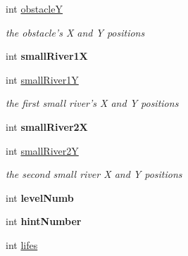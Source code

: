 \begin{DoxyCompactItemize}
\item 
\hypertarget{classlevels_ab81764075f081e95c05c12311556ff6b}{int \hyperlink{classlevels_ab81764075f081e95c05c12311556ff6b}{obstacle\-Y}}\label{classlevels_ab81764075f081e95c05c12311556ff6b}

\begin{DoxyCompactList}\small\item\em the obstacle's X and Y positions \end{DoxyCompactList}\item 
\hypertarget{classlevels_a91ffcd54642a5b8295120b633f2ea1ba}{int {\bfseries small\-River1\-X}}\label{classlevels_a91ffcd54642a5b8295120b633f2ea1ba}

\item 
\hypertarget{classlevels_a1804cb396c3fb68de1c9a7eae02d072b}{int \hyperlink{classlevels_a1804cb396c3fb68de1c9a7eae02d072b}{small\-River1\-Y}}\label{classlevels_a1804cb396c3fb68de1c9a7eae02d072b}

\begin{DoxyCompactList}\small\item\em the first small river's X and Y positions \end{DoxyCompactList}\item 
\hypertarget{classlevels_a6791f3ac3bd0ce71abebc9d97fdf5b99}{int {\bfseries small\-River2\-X}}\label{classlevels_a6791f3ac3bd0ce71abebc9d97fdf5b99}

\item 
\hypertarget{classlevels_accb17d0dad5fc7c43255f3a7703038a6}{int \hyperlink{classlevels_accb17d0dad5fc7c43255f3a7703038a6}{small\-River2\-Y}}\label{classlevels_accb17d0dad5fc7c43255f3a7703038a6}

\begin{DoxyCompactList}\small\item\em the second small river X and Y positions \end{DoxyCompactList}\item 
\hypertarget{classlevels_ab17e4fe300dfd85ff29f4291e1a605a5}{int {\bfseries level\-Numb}}\label{classlevels_ab17e4fe300dfd85ff29f4291e1a605a5}

\item 
\hypertarget{classlevels_aaaa0e73e933b36721beaa98a4ff1cfe6}{int {\bfseries hint\-Number}}\label{classlevels_aaaa0e73e933b36721beaa98a4ff1cfe6}

\item 
\hypertarget{classlevels_a815122a5ca11e2b46dc307e9bf7ee262}{int \hyperlink{classlevels_a815122a5ca11e2b46dc307e9bf7ee262}{lifes}}\label{classlevels_a815122a5ca11e2b46dc307e9bf7ee262}


\end{DoxyCompactItemize}
